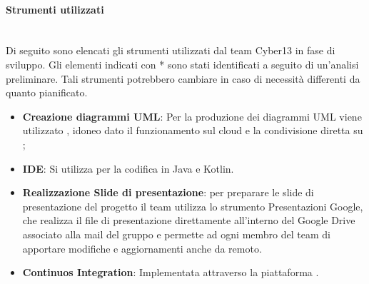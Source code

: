 \paragraph{Strumenti utilizzati}
\\Di seguito sono elencati gli strumenti utilizzati dal team Cyber13 in fase di sviluppo. Gli elementi indicati con * sono stati identificati a seguito di un'analisi preliminare. Tali strumenti potrebbero cambiare in caso di necessità differenti da quanto pianificato.
    \begin{itemize}
        \item \textbf{Creazione diagrammi UML}: Per la produzione dei diagrammi UML viene utilizzato , idoneo dato il funzionamento sul cloud e la condivisione diretta su ;
        \item \textbf{IDE}: Si utilizza  per la codifica in Java e Kotlin.
        \item \textbf{Realizzazione Slide di presentazione}: per preparare le slide di presentazione del progetto il team utilizza lo strumento Presentazioni Google, che realizza il file di presentazione direttamente all'interno del Google Drive associato alla mail del gruppo e permette ad ogni membro del team di apportare modifiche e aggiornamenti anche da remoto.
        \item \textbf{Continuos Integration}: Implementata attraverso la piattaforma .
       
    \end{itemize}
